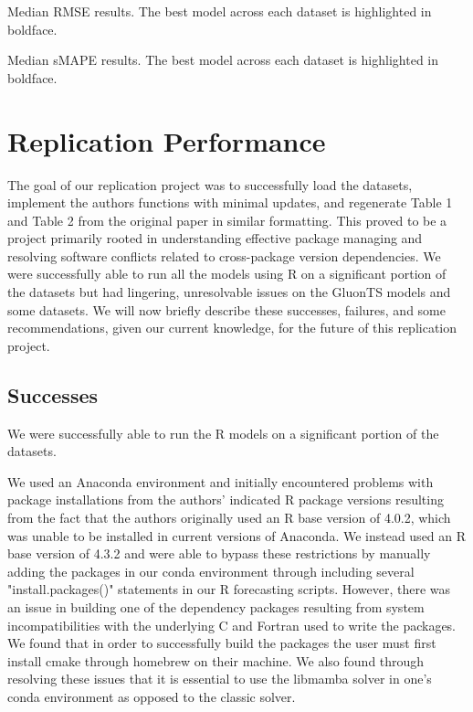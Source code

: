 \begin{table}[H]
    \caption{Median RMSE results. The best model across each dataset is highlighted in boldface.}
    \centering
    \resizebox{\textwidth}{!}{
    
    }
    \label{table:table_median_rmse.tex}
\end{table}

\begin{table}[H]
    \caption{Median sMAPE results. The best model across each dataset is highlighted in boldface.}
    \centering
    \resizebox{\textwidth}{!}{
    
    }
    \label{table:table_median_smape.tex}
\end{table}

\section{Replication Performance}
The goal of our replication project was to successfully load the datasets, implement the authors functions with minimal updates, and regenerate Table 1 and Table 2 from the original paper in similar formatting. This proved to be a project primarily rooted in understanding effective package managing and resolving software conflicts related to cross-package version dependencies. We were successfully able to run all the models using R on a significant portion of the datasets but had lingering, unresolvable issues on the GluonTS models and some datasets. We will now briefly describe these successes, failures, and some recommendations, given our current knowledge, for the future of this replication project. 

\subsection{Successes}
We were successfully able to run the R models on a significant portion of the datasets. 

We used an Anaconda environment and initially encountered problems with package installations from the authors' indicated R package versions resulting from the fact that the authors originally used an R base version of 4.0.2, which was unable to be installed in current versions of Anaconda. We instead used an R base version of 4.3.2 and were able to bypass these restrictions by manually adding the packages in our conda environment through including several "install.packages()" statements in our R forecasting scripts. However, there was an issue in building one of the dependency packages resulting from system incompatibilities with the underlying C and Fortran used to write the packages. We found that in order to successfully build the packages the user must first install cmake through homebrew on their machine. We also found through resolving these issues that it is essential to use the libmamba solver in one's conda environment as opposed to the classic solver. 

